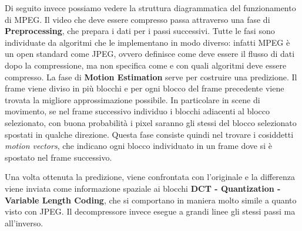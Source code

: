 Di seguito invece possiamo vedere la struttura diagrammatica del funzionamento di MPEG. Il video che deve essere compresso passa attraverso una fase di \textbf{Preprocessing}, che prepara i dati per i passi successivi. Tutte le fasi sono individuate da algoritmi che le implementano in modo diverso: infatti MPEG è un open standard come JPEG, ovvero definisce come deve essere il flusso di dati dopo la compressione, ma non specifica come e con quali algoritmi deve essere compresso. La fase di \textbf{Motion Estimation} serve per costruire una predizione. Il frame viene diviso in più blocchi e per ogni blocco del frame precedente viene trovata la migliore approssimazione possibile. In particolare in scene di movimento, se nel frame successivo individuo i blocchi adiacenti al blocco selezionato, con buona probabilità i pixel saranno gli stessi del blocco selezionato spostati in qualche direzione. Questa fase consiste quindi nel trovare i cosiddetti \textit{motion vectors}, che indicano ogni blocco individuato in un frame dove si è spostato nel frame successivo.

Una volta ottenuta la predizione, viene confrontata con l'originale e la differenza viene inviata come informazione spaziale ai blocchi \textbf{DCT - Quantization - Variable Length Coding}, che si comportano in maniera molto simile a quanto visto con JPEG. Il decompressore invece esegue a grandi linee gli stessi passi ma all'inverso.

\begin{figure}[htbp!]
  \centering
  
\end{figure}
\FloatBarrier

